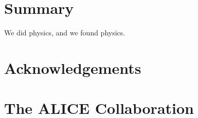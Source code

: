 \documentclass[ALICE,manyauthors]{cernphprep}
\begin{document}
\section{Summary}
\label{sec:Summary}
We did physics, and we found physics.

\newenvironment{acknowledgement}{\relax}{\relax}
\begin{acknowledgement}
\section*{Acknowledgements}
\end{acknowledgement}

%

\newpage
\appendix
%
%
\section{The ALICE Collaboration}
\label{app:collab}
\end{document}
